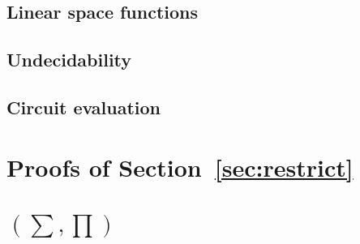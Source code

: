 \subsection{Linear space functions}


\subsection{Undecidability}


\subsection{Circuit evaluation}


\section{Proofs of Section~\ref{sec:restrict}}


\section{\lang$(\sum,\prod)$}


